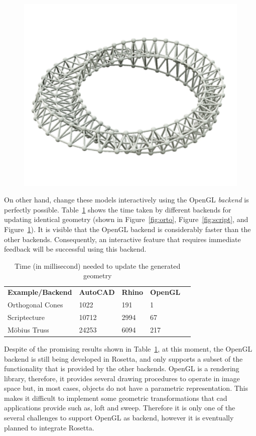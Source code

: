 \begin{figure}[h]
\begin{minipage}[t]{.33\textwidth}
  \includegraphics[width=.8\linewidth]{images/truss}
  \label{fig:mobius}
\end{minipage}
\end{figure}

On other hand, change these models interactively using the OpenGL \textit{backend} is perfectly possible. Table~\ref{tab:runtime} shows the time taken by different backends for updating identical geometry (shown in Figure~\ref{fig:orto}, Figure~\ref{fig:script}, and Figure~\ref{fig:mobius}). It is visible that the OpenGL backend is considerably faster than the other backends. Consequently, an interactive feature that requires immediate feedback will be successful using this backend.

\begin{table}[h]
\centering
\begin{tabular}{@{}lllll@{}}
\cmidrule(r){1-4}
\textbf{Example/Backend} & \textbf{AutoCAD} & \textbf{Rhino} & \textbf{OpenGL} &  \\ \cmidrule(r){1-4}
Orthogonal Cones & 1022 & 191 & 1 &  \\
Scriptecture & 10712 & 2994 & 67 &  \\
Möbius Truss & 24253 & 6094 & 217 &  \\ \cmidrule(r){1-4}
\end{tabular}
\caption{Time (in millisecond) needed to update the generated geometry}
\label{tab:runtime}
\end{table}

Despite of the promising results shown in Table~\ref{tab:runtime}, at this moment, the OpenGL backend is still being developed in Rosetta, and only supports a subset of the functionality that is provided by the other backends. OpenGL is a rendering library, therefore, it provides several drawing procedures to operate in image space but, in most cases, objects do not have a parametric representation. This makes it difficult to implement some geometric transformations that \gls{cad} applications provide such as, loft and sweep. Therefore it is only one of the several challenges to support OpenGL as backend, however it is eventually planned to integrate Rosetta.

